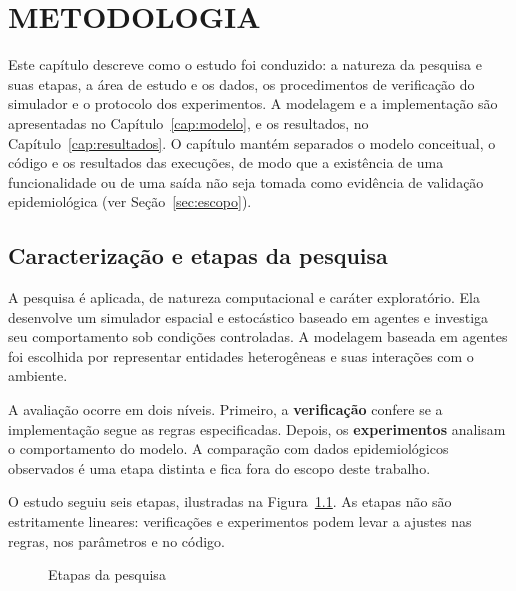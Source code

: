 \chapter{METODOLOGIA}
\label{cap:metodologia}

Este capítulo descreve como o estudo foi conduzido: a natureza da pesquisa e suas etapas, a área de estudo e os dados, os procedimentos de verificação do simulador e o protocolo dos experimentos. A modelagem e a implementação são apresentadas no Capítulo~\ref{cap:modelo}, e os resultados, no Capítulo~\ref{cap:resultados}. O capítulo mantém separados o modelo conceitual, o código e os resultados das execuções, de modo que a existência de uma funcionalidade ou de uma saída não seja tomada como evidência de validação epidemiológica (ver Seção~\ref{sec:escopo}).

\section{Caracterização e etapas da pesquisa}

A pesquisa é aplicada, de natureza computacional e caráter exploratório. Ela desenvolve um simulador espacial e estocástico baseado em agentes e investiga seu comportamento sob condições controladas. A modelagem baseada em agentes foi escolhida por representar entidades heterogêneas e suas interações com o ambiente.

A avaliação ocorre em dois níveis. Primeiro, a \textbf{verificação} confere se a implementação segue as regras especificadas. Depois, os \textbf{experimentos} analisam o comportamento do modelo. A comparação com dados epidemiológicos observados é uma etapa distinta e fica fora do escopo deste trabalho.

O estudo seguiu seis etapas, ilustradas na Figura~\ref{fig:etapas}. As etapas não são estritamente lineares: verificações e experimentos podem levar a ajustes nas regras, nos parâmetros e no código.

\begin{figure}[htb]
    \centering
    \caption{Etapas da pesquisa}
    \label{fig:etapas}
\end{figure}

